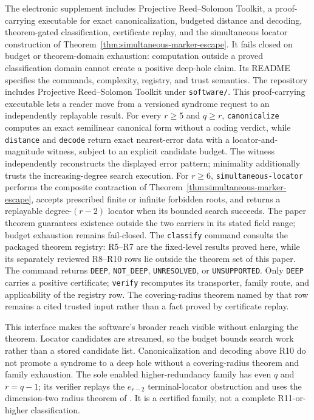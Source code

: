 \ifTITSubmission
The electronic supplement includes Projective Reed--Solomon Toolkit, a
proof-carrying executable for exact canonicalization, budgeted distance and
decoding, theorem-gated classification, certificate replay, and the
simultaneous locator construction of
Theorem~\ref{thm:simultaneous-marker-escape}.  It fails closed on budget or
theorem-domain exhaustion: computation outside a proved classification domain
cannot create a positive deep-hole claim.  Its README specifies the commands,
complexity, registry, and trust semantics.
\else
The repository includes Projective Reed--Solomon Toolkit under
\texttt{software/}.  This proof-carrying executable lets a reader move from a
versioned syndrome request to an independently replayable result.  For every
$r\geq5$ and $q\geq r$, \texttt{canonicalize} computes an exact semilinear
canonical form without a coding verdict, while \texttt{distance} and
\texttt{decode} return exact nearest-error data with a locator-and-magnitude
witness, subject to an explicit candidate budget.  The witness independently
reconstructs the displayed error pattern; minimality additionally trusts the
increasing-degree search execution.  For \(r\geq6\),
\texttt{simultaneous-locator} performs the composite contraction of
Theorem~\ref{thm:simultaneous-marker-escape}, accepts prescribed finite or
infinite forbidden roots, and returns a replayable degree-\((r-2)\) locator
when its bounded search succeeds.  The paper theorem guarantees existence
outside the two carriers in its stated field range; budget exhaustion remains
fail-closed.  The
\texttt{classify} command consults the packaged theorem registry: R5--R7 are
the fixed-level results proved here, while its separately reviewed R8--R10
rows lie outside the theorem set of this paper.  The command
returns \texttt{DEEP}, \texttt{NOT\_DEEP}, \texttt{UNRESOLVED}, or
\texttt{UNSUPPORTED}.  Only \texttt{DEEP} carries a positive certificate;
\texttt{verify} recomputes its transporter, family route, and applicability of
the registry row.  The covering-radius theorem named by that row remains a
cited trusted input rather than a fact proved by certificate replay.

This interface makes the software's broader reach visible without enlarging
the theorem.  Locator candidates are streamed, so the budget bounds search
work rather than a stored candidate list.  Canonicalization and decoding above
R10 do not promote a syndrome to a deep hole without a covering-radius theorem
and family exhaustion.  The sole enabled higher-redundancy family has even
$q$ and $r=q-1$; its verifier replays the $e_{r-2}$ terminal-locator
obstruction and uses the dimension-two radius theorem of
\cite[Thm.~17(1)]{WuDingChen2023}.  It is a certified family, not a complete
R11-or-higher classification.
\fi
